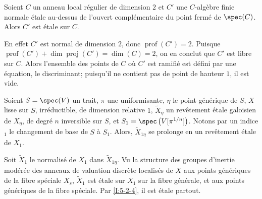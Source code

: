 \begingroup
\renewcommand*{\thesubsubsection}{2.3.1}
\begin{lemmadotdash}\label{I:5-2-4} %
Soient $C$ un anneau local régulier de dimension $2$ et $C'$ une $C$-algèbre 
finie normale étale au-dessus de l'ouvert complémentaire du point fermé 
de $\spec(C)$. Alors $C'$ est étale sur $C$.
\end{lemmadotdash}
\endgroup

En effet $C'$ est normal de dimension $2$, donc $\operatorname{prof}(C')=2$. 
Puisque $\operatorname{prof}(C')+\dim\operatorname{proj}(C') = \dim(C)=2$, on 
en conclut que $C'$ est libre sur $C$. Alors l'ensemble des points de $C$ où 
$C'$ est ramifié est défini par une équation, le discriminant; puisqu'il 
ne contient pas de point de hauteur $1$, il est vide. 





\begingroup
\renewcommand*{\thesubsubsection}{2.3.2}
\begin{lemmadotdash}\label{I:5-2-5} %
Soient $S=\spec(V)$ un trait, $\pi$ une uniformisante, $\eta$ le point 
générique de $S$, $X$ lisse sur $S$, irréductible, de dimension 
relative $1$, $\widetilde X_\eta$ un revêtement étale galoisien de $X_\eta$, 
de degré $n$ inversible sur $S$, et $S_1=\spec\left(V[\pi^{1/n}]\right)$. 
Notons par un indice ${}_1$ le changement de base de $S$ à $S_1$. Alors, 
$\widetilde X_{1\eta}$ se prolonge en un revêtement étale de $X_1$. 
\end{lemmadotdash}
\endgroup

Soit $\widetilde X_1$ le normalisé de $X_1$ dans $\widetilde X_{1\eta}$. Vu la 
structure des groupes d'inertie modérée des anneaux de valuation discrète 
localisés de $X$ aux points génériques de la fibre spéciale $X_s$, 
$\widetilde X_1$ est étale sur $X_1$ sur la fibre générale, et aux points 
génériques de la fibre spéciale. Par \ref{I:5-2-4}, il est étale 
partout. 





